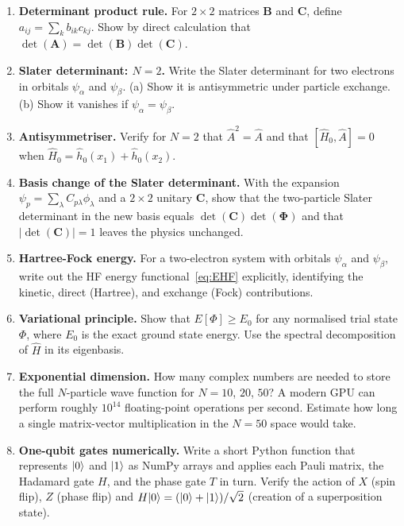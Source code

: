 \begin{enumerate}

\item \textbf{Determinant product rule.}
  For $2\times 2$ matrices $\bm{B}$ and $\bm{C}$, define
  $a_{ij}=\sum_k b_{ik}c_{kj}$.  Show by direct calculation that
  $\det(\bm{A})=\det(\bm{B})\det(\bm{C})$.

\item \textbf{Slater determinant: $N=2$.}
  Write the Slater determinant for two electrons in orbitals
  $\psi_\alpha$ and $\psi_\beta$.
  (a) Show it is antisymmetric under particle exchange.
  (b) Show it vanishes if $\psi_\alpha=\psi_\beta$.

\item \textbf{Antisymmetriser.}
  Verify for $N=2$ that $\hat{A}^2=\hat{A}$ and that
  $[\hat{H}_0,\hat{A}]=0$ when $\hat{H}_0=\hat{h}_0(x_1)+\hat{h}_0(x_2)$.

\item \textbf{Basis change of the Slater determinant.}
  With the expansion $\psi_p=\sum_\lambda C_{p\lambda}\phi_\lambda$
  and a $2\times 2$ unitary $\bm{C}$, show that the two-particle
  Slater determinant in the new basis equals $\det(\bm{C})\det(\bm{\Phi})$
  and that $|\det(\bm{C})|=1$ leaves the physics unchanged.

\item \textbf{Hartree-Fock energy.}
  For a two-electron system with orbitals $\psi_\alpha$ and
  $\psi_\beta$, write out the HF energy functional~\eqref{eq:EHF}
  explicitly, identifying the kinetic, direct (Hartree), and exchange
  (Fock) contributions.

\item \textbf{Variational principle.}
  Show that $E[\Phi]\geq E_0$ for any normalised trial state $\Phi$,
  where $E_0$ is the exact ground state energy.  Use the spectral
  decomposition of $\hat{H}$ in its eigenbasis.

\item \textbf{Exponential dimension.}
  How many complex numbers are needed to store the full $N$-particle
  wave function for $N=10$, $20$, $50$?  A modern GPU can perform
  roughly $10^{14}$ floating-point operations per second.  Estimate
  how long a single matrix-vector multiplication in the $N=50$ space
  would take.

\item \textbf{One-qubit gates numerically.}
  Write a short Python function that represents $\vert 0 \rangle$ and
  $\vert 1 \rangle$ as NumPy arrays and applies each Pauli matrix,
  the Hadamard gate $H$, and the phase gate $T$ in turn.
  Verify the action of $X$ (spin flip), $Z$ (phase flip) and
  $H\vert 0 \rangle=(\vert 0 \rangle+\vert 1 \rangle)/\sqrt{2}$ (creation of a
  superposition state).


\end{enumerate}
